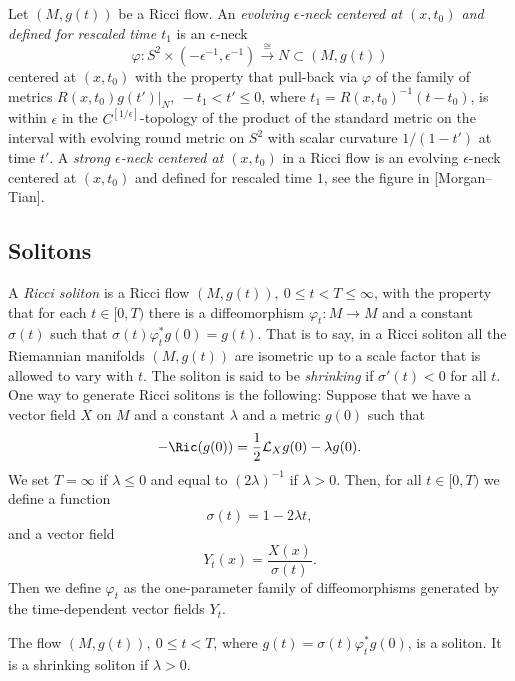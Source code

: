 \begin{definition}\label{def:evolving-epsilon-neck}
\label{strongepsneck}
Let $(M,g(t))$ be a Ricci flow. An {\em evolving $\epsilon$-neck
centered at $(x,t_0)$ and defined for rescaled time
$t_1$} is an $\epsilon$-neck
$$\varphi\colon S^2\times
(-\epsilon^{-1},\epsilon^{-1})\xrightarrow{\cong}
N\subset (M,g(t))$$ centered at $(x,t_0)$ with the property that
pull-back via $\varphi$ of the family of metrics $R(x,t_0)g(t')|_N,\
-t_1< t'\le 0$, where $t_1=R(x,t_0)^{-1}(t-t_0)$, is within
$\epsilon$ in the $C^{[1/\epsilon]}$-topology of the product of the
standard metric on the interval with evolving round metric on $S^2$
with scalar curvature $1/(1-t')$ at time $t'$. A {\em strong
$\epsilon$-neck centered at
$(x,t_0)$} in a Ricci flow is an
evolving $\epsilon$-neck centered at $(x,t_0)$ and defined for
rescaled time $1$, see the figure in [Morgan--Tian].
\end{definition}


\subsection{Solitons}

A {\sl Ricci soliton}
is a Ricci flow $(M,g(t)),\ 0\le t<T\le \infty$, with the property that for
each $t\in [0,T)$ there is a diffeomorphism $\varphi_t\colon M\to M$ and a
constant $\sigma(t)$ such that $\sigma(t)\varphi_t^*g(0)=g(t)$. That is to say,
in a Ricci soliton all the Riemannian manifolds $(M,g(t))$ are isometric up to
a scale factor that is allowed to vary with $t$. The soliton is said to be {\em
shrinking} if $\sigma'(t)<0$ for all $t$. One way to generate Ricci solitons is
the following: Suppose that we have a vector field $X$ on $M$ and a constant
$\lambda$ and a metric $g(0)$ such that
\begin{equation}\label{soliton}
-\Ric(g(0))=\frac{1}{2}{\mathcal L}_Xg(0)-\lambda g(0).
\end{equation} We set $T=\infty$ if $\lambda\le 0$ and equal to $(2\lambda)^{-1}$
if $\lambda>0$. Then, for all $t\in [0,T)$ we define a function
$$\sigma(t)=1-2\lambda t,$$
and a vector field
$$Y_t(x)=\frac{X(x)}{\sigma(t)}.$$
 Then we define $\varphi_t$ as the one-parameter
family of diffeomorphisms generated by the time-dependent vector
fields $Y_t$.
\begin{claim}[Soliton generation]\label{claim:soliton-generation}
\label{solitonclaim}
 The flow
$(M,g(t)),\ 0\le t<T$, where $g(t)=\sigma(t)\varphi_t^*g(0)$, is a soliton. It
is a shrinking soliton if $\lambda>0$.
\end{claim}


